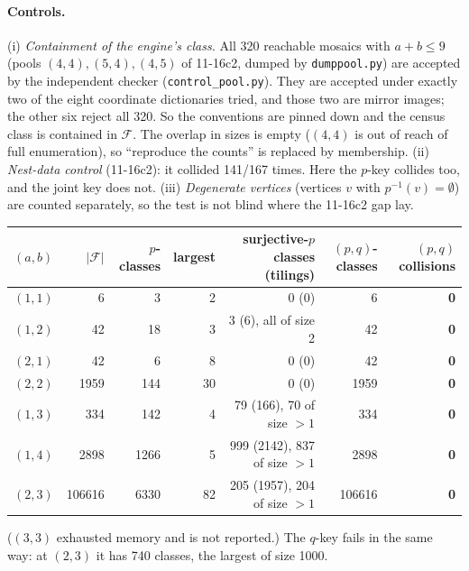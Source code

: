 \documentclass[11pt]{article}
\theoremstyle{definition}
\begin{document}
\paragraph{Controls.}
(i) \emph{Containment of the engine's class.} All 320 reachable mosaics with $a+b\le9$ (pools $(4,4),(5,4),(4,5)$ of 11-16c2, dumped by \texttt{dumppool.py})
are accepted by the independent checker (\texttt{control\_pool.py}). They are accepted under exactly two of the eight coordinate dictionaries tried, and those two are
mirror images; the other six reject all 320. So the conventions are pinned down and the census class is contained in $\mathcal F$. The overlap in sizes is empty
($(4,4)$ is out of reach of full enumeration), so ``reproduce the counts'' is replaced by membership.
(ii) \emph{Nest-data control} (11-16c2): it collided 141/167 times. Here the $p$-key collides too, and the joint key does not.
(iii) \emph{Degenerate vertices} (vertices $v$ with $p^{-1}(v)=\emptyset$) are counted separately, so the test is not blind where the 11-16c2 gap lay.

\begin{center}\begin{tabular}{lrrrrrr}\toprule
$(a,b)$ & $|\mathcal F|$ & $p$-classes & largest & surjective-$p$ classes (tilings) & $(p,q)$-classes & $(p,q)$ collisions\\\midrule
$(1,1)$ & 6 & 3 & 2 & 0 (0) & 6 & \textbf 0\\
$(1,2)$ & 42 & 18 & 3 & 3 (6), all of size 2 & 42 & \textbf 0\\
$(2,1)$ & 42 & 6 & 8 & 0 (0) & 42 & \textbf 0\\
$(2,2)$ & 1959 & 144 & 30 & 0 (0) & 1959 & \textbf 0\\
$(1,3)$ & 334 & 142 & 4 & 79 (166), 70 of size $>1$ & 334 & \textbf 0\\
$(1,4)$ & 2898 & 1266 & 5 & 999 (2142), 837 of size $>1$ & 2898 & \textbf 0\\
$(2,3)$ & 106616 & 6330 & 82 & 205 (1957), 204 of size $>1$ & 106616 & \textbf 0\\\bottomrule
\end{tabular}\end{center}
($(3,3)$ exhausted memory and is not reported.) The $q$-key fails in the same way: at $(2,3)$ it has 740 classes, the largest of size 1000.
\end{document}
